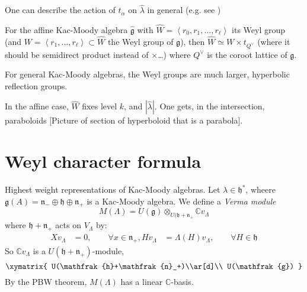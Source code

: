 One can describe the action of $t_\alpha$ on $\hat{\lambda}$ in general 
(e.g. see \cite[Chapter 6]{IDLA})

\begin{proposition}
\label{proposition-Weyl-group-of-affine-Kac-Moody-algebra}
For the affine Kac-Moody algebra $\hat{\mathfrak{g}}$
 with $\hat{W}=\left<r_0,r_1,\ldots,r_\ell\right>$ its Weyl group 
(and $W=\left<r_1,\ldots,r_\ell\right>\subset \hat{W}$ the Weyl group of
$\mathfrak{g}$), then $\hat{W} \simeq W\times t_{Q^\vee}$ (where it should be
semidirect product instead of $\times$…) where $Q^\vee$ is the
coroot lattice of $\mathfrak{g}$.
\end{proposition}

\begin{remark}
\label{remark-Weyl-groups-are-large-for-other-Kac-Moody-algebras}
For general Kac-Moody algebras, the Weyl groups are much larger, hyperbolic
reflection groups.
\end{remark}

In the affine case, $\hat{W}$ fixes level $k$, and $|\hat{\lambda}|$. One gets,
in the intersection, paraboloids [Picture of section of hyperboloid that is a
parabola].

\section{Weyl character formula}
\label{section-Weyl-character-formula}
Highest weight representations of Kac-Moody algebras. 
Let $\lambda \in \mathfrak{h}^*$, wheere
$\mathfrak{g}(A)=\mathfrak{n}_-\oplus\mathfrak{h}\oplus \mathfrak{n}_+$ 
is a Kac-Moody algebra. We define a {\it Verma module} 
$$
M(\Lambda)
=U(\mathfrak{g}) \otimes_{U(\mathfrak{h}+\mathfrak{n}_+}\mathbb{C}v_\Lambda
$$
where $\mathfrak{h}+\mathfrak{n}_+$ acts on $V_\Lambda$ by:
\begin{align*}
Xv_\Lambda&=0,\qquad \forall x \in \mathfrak{n}_+,
Hv_\Lambda&=\Lambda(H)v_\Lambda,\qquad \forall H \in \mathfrak{h}
\end{align*}
So $\mathbb{C} v_\Lambda$ is a $U(\mathfrak{h}+\mathfrak{n}_+)$-module,
$$
\xymatrix{
U(\mathfrak{h}+\mathfrak{n}_+)\\ar[d]\\
U(\mathfrak{g})
}
$$
By the PBW theorem, $M(\Lambda)$ has a linear $\mathbb{C}$-basis.

